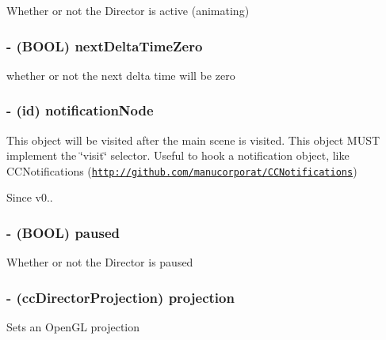 Whether or not the Director is active (animating) \hypertarget{class_c_c_director_aef654b999ea5eab251222c340a12df24}{
\subsubsection[{next\-Delta\-Time\-Zero}]{\setlength{\rightskip}{0pt plus 5cm}-\/ (B\-O\-O\-L) {\bf next\-Delta\-Time\-Zero}}}\label{class_c_c_director_aef654b999ea5eab251222c340a12df24}
whether or not the next delta time will be zero \hypertarget{class_c_c_director_a073ee609bdbd2b99ea70e5881cebfdac}{
\subsubsection[{notification\-Node}]{\setlength{\rightskip}{0pt plus 5cm}-\/ (id) {\bf notification\-Node}}}\label{class_c_c_director_a073ee609bdbd2b99ea70e5881cebfdac}
This object will be visited after the main scene is visited. This object M\-U\-S\-T implement the \char`\"{}visit\char`\"{} selector. Useful to hook a notification object, like C\-C\-Notifications (\href{http://github.com/manucorporat/CCNotifications}{\tt http\-://github.\-com/manucorporat/\-C\-C\-Notifications}) \begin{DoxySince}{Since}
v0.. 
\end{DoxySince}
\hypertarget{class_c_c_director_ab429550cc193f7f0a5bbc1e0493acc69}{
\subsubsection[{paused}]{\setlength{\rightskip}{0pt plus 5cm}-\/ (B\-O\-O\-L) {\bf paused}}}\label{class_c_c_director_ab429550cc193f7f0a5bbc1e0493acc69}
Whether or not the Director is paused \hypertarget{class_c_c_director_ac46efb3879931d41918b30e68e904d32}{
\subsubsection[{projection}]{\setlength{\rightskip}{0pt plus 5cm}-\/ (cc\-Director\-Projection) {\bf projection}}}\label{class_c_c_director_ac46efb3879931d41918b30e68e904d32}
Sets an Open\-G\-L projection 


